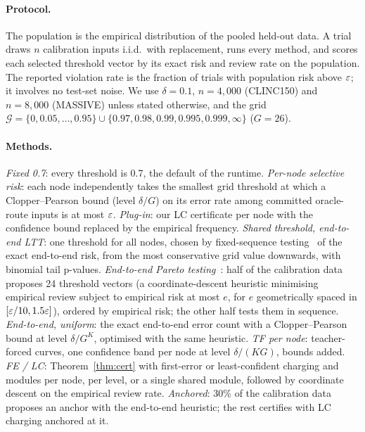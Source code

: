 \paragraph{Protocol.} The population is the empirical distribution of the pooled held-out
data. A trial draws $n$ calibration inputs i.i.d.\ with replacement, runs every method, and
scores each selected threshold vector by its exact risk and review rate on the population.
The reported violation rate is the fraction of trials with population risk above $\varepsilon$; it
involves no test-set noise. We use $\delta=0.1$, $n=4{,}000$ (CLINC150) and $n=8{,}000$
(MASSIVE) unless stated otherwise, and the grid
$\mathcal G=\{0,0.05,\dots,0.95\}\cup\{0.97,0.98,0.99,0.995,0.999,\infty\}$ ($G=26$).

\paragraph{Methods.}
\emph{Fixed 0.7}: every threshold is 0.7, the default of the runtime.
\emph{Per-node selective risk}: each node independently takes the smallest grid threshold at
which a Clopper--Pearson bound (level $\delta/G$) on its error rate among committed
oracle-route inputs is at most $\varepsilon$.
\emph{Plug-in}: our LC certificate per node with the confidence bound replaced by the
empirical frequency.
\emph{Shared threshold, end-to-end LTT}: one threshold for all nodes, chosen by fixed-sequence
testing~\citep{angelopoulos2021ltt} of the exact end-to-end risk, from the most conservative
grid value downwards, with binomial tail p-values.
\emph{End-to-end Pareto testing}~\citep{laufer2022pareto}: half of the calibration data
proposes 24 threshold vectors (a coordinate-descent heuristic minimising empirical review
subject to empirical risk at most $e$, for $e$ geometrically spaced in $[\varepsilon/10,1.5\varepsilon]$),
ordered by empirical risk; the other half tests them in sequence.
\emph{End-to-end, uniform}: the exact end-to-end error count with a Clopper--Pearson bound at
level $\delta/G^{K}$, optimised with the same heuristic.
\emph{TF per node}: teacher-forced curves, one confidence band per node at level
$\delta/(KG)$, bounds added.
\emph{FE / LC}: Theorem~\ref{thm:cert} with first-error or least-confident charging and
modules per node, per level, or a single shared module, followed by coordinate descent on the
empirical review rate.
\emph{Anchored}: 30\% of the calibration data proposes an anchor with the end-to-end
heuristic; the rest certifies with LC charging anchored at it.

